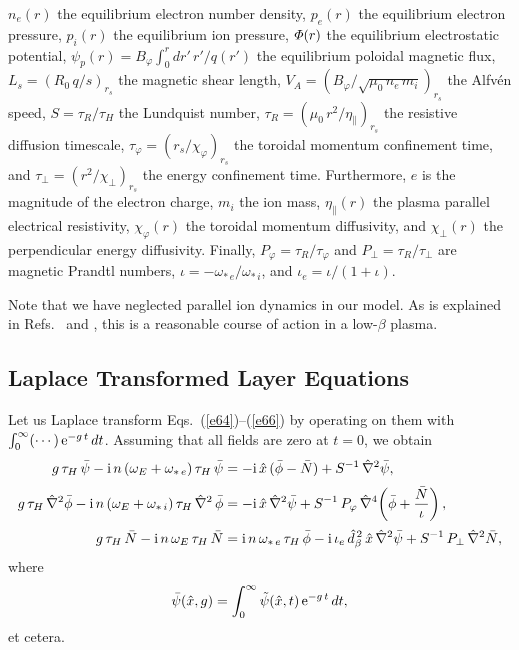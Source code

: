 \documentclass[12pt,prb,aps]{revtex4-1}
\begin{document}
$n_e(r)$ the equilibrium electron number density, $p_e(r)$ the equilibrium electron pressure, $p_i(r)$ the equilibrium ion pressure, ${\mit\Phi}(r)$ the equilibrium 
electrostatic potential, $\psi_p(r)= B_\varphi \int_0^r dr'\,r'/q(r')$ the equilibrium poloidal magnetic flux, 
$L_s=(R_0\,q/s)_{r_s}$ the magnetic shear length, $V_A=(B_\varphi/\sqrt{\mu_0\,n_e\,m_i})_{r_s}$ the Alfv\'{e}n speed, $S=\tau_R/\tau_H$ the Lundquist number,
$\tau_R= (\mu_0\,r^2/\eta_\parallel)_{r_s}$ the resistive diffusion timescale, $\tau_\varphi= (r_s/\chi_\varphi)_{r_s}$ the toroidal momentum confinement
time, and $\tau_\perp=(r^2/\chi_\perp)_{r_s}$ the energy confinement time. Furthermore, $e$ is the magnitude of the electron charge, $m_i$ the ion mass,
$\eta_\parallel(r)$ the plasma parallel electrical resistivity, $\chi_\varphi(r)$ the toroidal momentum diffusivity, and $\chi_\perp(r)$ the perpendicular  energy diffusivity. 
Finally, $P_\varphi=\tau_R/\tau_\varphi$ and $P_\perp=\tau_R/\tau_\perp$ are magnetic Prandtl numbers, $\iota=-\omega_{\ast\,e}/\omega_{\ast\,i}$, 
and $\iota_e=\iota/(1+\iota)$. 

 Note that we have neglected parallel ion dynamics in our model.
As is explained in Refs.~ and
, this is a reasonable course of action in a low-$\beta$ plasma. 

\subsection{Laplace Transformed Layer Equations}
Let us Laplace transform Eqs.~(\ref{e64})--(\ref{e66}) by operating on them with
$\int_0^\infty (\cdots)\,{\rm e}^{-g\,t}\,dt$. Assuming that all fields are zero at $t=0$, we obtain
\begin{align}\label{e67}
g\,\tau_H\,\bar{\psi}-{\rm i}\,n\,(\omega_E +\omega_{\ast\,e})\,\tau_H\,\bar{\psi} &= -{\rm i} \,\hat{x}\,(\bar{\phi}-\bar{N})+ S^{-1}\,\hat{\nabla}^2\bar{\psi},\\[0.5ex]
g\,\tau_H\,\hat{\nabla}^2\bar{\phi}-{\rm i}\,n\,(\omega_E+\omega_{\ast\,i})\,\tau_H\,\hat{\nabla}^2\,\bar{\phi} &= -{\rm i}\,\hat{x}\,\hat{\nabla}^2\bar{\psi}+S^{-1}\,P_\varphi\,\hat{\nabla}^4\!\left(\bar{\phi} + \frac{\bar{N}}{\iota}\right),\\[0.5ex]
g\,\tau_H\,\bar{N}-{\rm i}\,n\,\omega_E\,\tau_H\,\bar{N} &= {\rm i}\,n\,\omega_{\ast\,e}\,\tau_H\,\bar{\phi} - {\rm i}\,\iota_e\,\hat{d}_\beta^{\,2}\,\hat{x}\,\hat{\nabla}^2\bar{\psi}+ S^{-1}\,P_\perp\,\hat{\nabla}^2 \bar{N},\label{e69}
\end{align}
where
\begin{equation}
\bar{\psi}(\hat{x},g) = \int_0^\infty \tilde{\psi}(\hat{x},t)\,{\rm e}^{-g\,t}\,dt,
\end{equation}
et cetera. 
\end{document}
